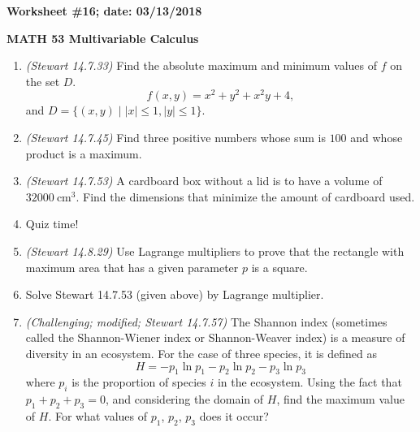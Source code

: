 \documentclass{article}
\begin{document}
{\bf Worksheet \#16; date: 03/13/2018}

{\bf MATH 53 Multivariable Calculus}

\begin{enumerate}
\item {\em (Stewart 14.7.33)} Find the absolute maximum and minimum values of $f$ on the set $D$.
\[
f(x, y) = x^2 + y^2 + x^2 y + 4,
\]
and $D = \{(x, y) \;|\; |x| \le 1, |y| \le 1\}$.

\item {\em (Stewart 14.7.45)} Find three positive numbers whose sum is $100$ and whose product is a maximum.

\item {\em (Stewart 14.7.53)} A cardboard box without a lid is to have a volume of $32000~\text{cm}^3$. Find the dimensions that minimize the amount of cardboard used.

\item Quiz time!

\item {\em (Stewart 14.8.29)} Use Lagrange multipliers to prove that the rectangle with maximum area that has a given parameter $p$ is a square.

\item Solve Stewart 14.7.53 (given above) by Lagrange multiplier.

\item {\em (Challenging; modified; Stewart 14.7.57)} The Shannon index (sometimes called the Shannon-Wiener index or Shannon-Weaver index) is a measure of diversity in an ecosystem. For the case of three species, it is defined as
\[
H = -p_1 \ln p_1 - p_2 \ln p_2 - p_3 \ln p_3
\]
where $p_i$ is the proportion of species $i$ in the ecosystem. Using the fact that $p_1 + p_2 + p_3 = 0$, and considering the domain of $H$, find the maximum value of $H$. For what values of $p_1$, $p_2$, $p_3$ does it occur?

\end{enumerate}
\end{document}
